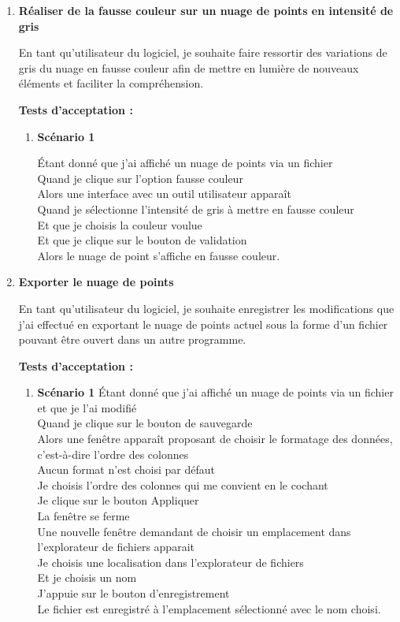 \documentclass[12pt,titlepage,french]{article}
\begin{document}
\begin{enumerate}
\begin{enumerate}
\end{enumerate}
\item \textbf{Réaliser de la fausse couleur sur un nuage de points en intensité de gris}

En tant qu'utilisateur du logiciel, je souhaite faire ressortir des variations de gris du nuage en fausse couleur afin de mettre en lumière de nouveaux éléments et faciliter la compréhension.

\textbf{Tests d'acceptation :}

\begin{enumerate}
    \item \textbf{Scénario 1}
    
Étant donné que j'ai affiché un nuage de points via un fichier\\
Quand je clique sur l'option fausse couleur\\
Alors une interface avec un outil utilisateur apparaît\\
Quand je sélectionne l'intensité de gris à mettre en fausse couleur\\
Et que je choisis la couleur voulue\\
Et que je clique sur le bouton de validation\\
Alors le nuage de point s'affiche en fausse couleur.
\end{enumerate}

\item \textbf{Exporter le nuage de points}
    
En tant qu'utilisateur du logiciel, je souhaite enregistrer les modifications que j'ai effectué en exportant le nuage de points actuel sous la forme d'un fichier pouvant être ouvert dans un autre programme.

\textbf{Tests d'acceptation :}

\begin{enumerate}
    \item \textbf{Scénario 1}
Étant donné que j'ai affiché un nuage de points via un fichier et que je l'ai modifié\\
Quand je clique sur le bouton de sauvegarde\\
Alors une fenêtre apparaît proposant de choisir le formatage des données, c'est-à-dire l'ordre des colonnes\\
Aucun format n'est choisi par défaut\\
Je choisis l'ordre des colonnes qui me convient en le cochant\\
Je clique sur le bouton Appliquer\\
La fenêtre se ferme\\
Une nouvelle fenêtre demandant de choisir un emplacement dans l'explorateur de fichiers apparait\\
Je choisis une localisation dans l'explorateur de fichiers\\
Et je choisis un nom\\
J'appuie sur le bouton d'enregistrement\\
Le fichier est enregistré à l'emplacement sélectionné avec le nom choisi.


\end{enumerate}
\end{enumerate}
\end{document}
